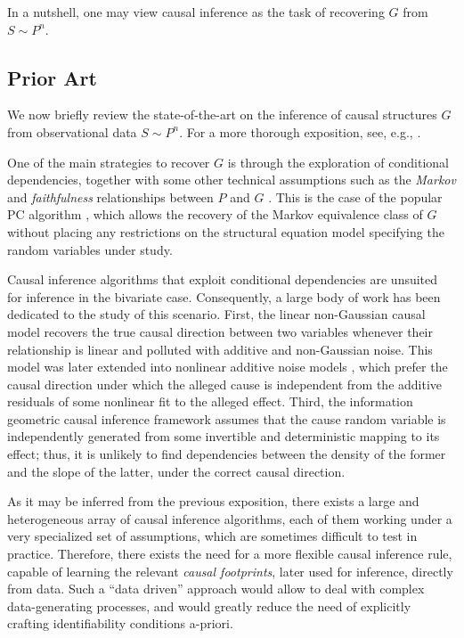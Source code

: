 \documentclass{article}
\begin{document}
In a nutshell, one may view causal inference as the task of recovering $G$ from $S
\sim P^n$.  

\subsection{Prior Art}

We now briefly review the state-of-the-art on the inference of causal
structures $G$ from observational data $S\sim P^n$. For a more thorough
exposition, see, e.g., \citet{Mooij14}.

One of the main strategies to recover $G$ is through the exploration of
conditional dependencies, together with some other technical assumptions such
as the \emph{Markov} and \emph{faithfulness} relationships between $P$ and $G$
\citep{Pearl00}. This is the case of the popular PC algorithm
\citep{Spirtes00}, which allows the recovery of the Markov equivalence class of
$G$ without placing any restrictions on the structural equation model
specifying the random variables under study. 

Causal inference algorithms that exploit conditional
dependencies are unsuited for inference in the bivariate case.  Consequently,
a large body of work has been dedicated to the study of this scenario.  First,
the linear non-Gaussian causal model \citep{Shimizu06,Shimizu11} recovers the
true causal direction between two variables whenever their relationship is
linear and polluted with additive and non-Gaussian noise. This model was later extended into 
nonlinear additive noise models
\citep{Hoyer09,Zhang09,Stegle10,Kpotufe13,Peters14:ANM}, which prefer the causal
direction under which the alleged cause is independent from the additive
residuals of some nonlinear fit to the alleged effect.  Third, the information
geometric causal inference framework \citep{Daniusis12,Janzing14} assumes that
the cause random variable is independently generated from some invertible and
deterministic mapping to its effect; thus, it is unlikely to find dependencies
between the density of the former and the slope of the latter, under the
correct causal direction.

As it may be inferred from the previous exposition, there exists a large and
heterogeneous array of causal inference algorithms, each of them working under
a very specialized set of assumptions, which are sometimes difficult to test in
practice. Therefore, there exists the need for a more flexible causal inference
rule, capable of learning the relevant \emph{causal
footprints}, later used for inference, directly from data. Such a ``data driven'' approach would
allow to deal with complex data-generating processes, and would greatly reduce 
the need of explicitly crafting identifiability conditions a-priori.
\end{document}
